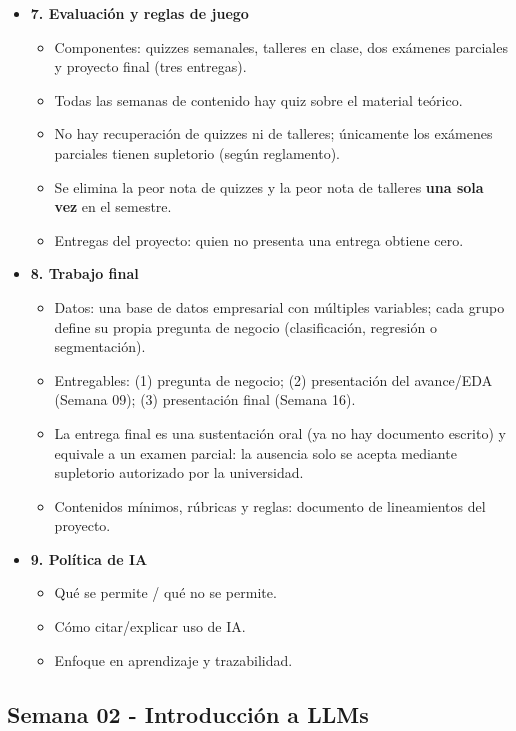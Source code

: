 \documentclass{article}
\begin{document}
\begin{itemize}
\item \textbf{7. Evaluación y reglas de juego}
\begin{itemize}
  \item Componentes: quizzes semanales, talleres en clase, dos exámenes parciales y proyecto final (tres entregas).
  \item Todas las semanas de contenido hay quiz sobre el material teórico.
  \item No hay recuperación de quizzes ni de talleres; únicamente los exámenes parciales tienen supletorio (según reglamento).
  \item Se elimina la peor nota de quizzes y la peor nota de talleres \textbf{una sola vez} en el semestre.
  \item Entregas del proyecto: quien no presenta una entrega obtiene cero.
\end{itemize}

\item \textbf{8. Trabajo final}
\begin{itemize}
  \item Datos: una base de datos empresarial con múltiples variables; cada grupo define su propia pregunta de negocio (clasificación, regresión o segmentación).
  \item Entregables: (1) pregunta de negocio; (2) presentación del avance/EDA (Semana 09); (3) presentación final (Semana 16).
  \item La entrega final es una sustentación oral (ya no hay documento escrito) y equivale a un examen parcial: la ausencia solo se acepta mediante supletorio autorizado por la universidad.
  \item Contenidos mínimos, rúbricas y reglas: documento de lineamientos del proyecto.
\end{itemize}

\item \textbf{9. Política de IA}
\begin{itemize}
  \item Qué se permite / qué no se permite.
  \item Cómo citar/explicar uso de IA.
  \item Enfoque en aprendizaje y trazabilidad.
\end{itemize}
\end{itemize}

\newpage
\subsection{Semana 02 - Introducción a LLMs}
\vspace{0.2 cm}
\end{document}
